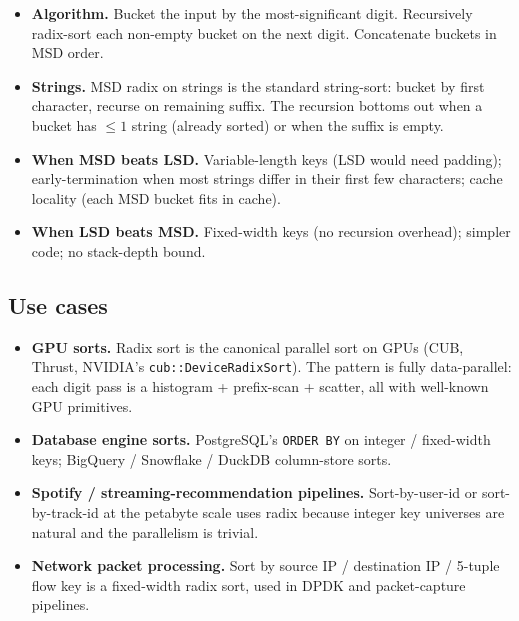 \documentclass[11pt]{article}
\begin{document}
\begin{itemize}[leftmargin=*]
    \item \textbf{Algorithm.} Bucket the input by the
          most-significant digit. Recursively radix-sort each
          non-empty bucket on the next digit. Concatenate buckets
          in MSD order.
    \item \textbf{Strings.} MSD radix on strings is the standard
          string-sort: bucket by first character, recurse on
          remaining suffix. The recursion bottoms out when a
          bucket has $\le 1$ string (already sorted) or when the
          suffix is empty.
    \item \textbf{When MSD beats LSD.} Variable-length keys (LSD
          would need padding); early-termination when most strings
          differ in their first few characters; cache locality
          (each MSD bucket fits in cache).
    \item \textbf{When LSD beats MSD.} Fixed-width keys
          (no recursion overhead); simpler code; no
          stack-depth bound.
\end{itemize}

\subsection*{Use cases}

\begin{itemize}[leftmargin=*]
    \item \textbf{GPU sorts.} Radix sort is the canonical parallel
          sort on GPUs (CUB, Thrust, NVIDIA's \texttt{cub::DeviceRadixSort}).
          The pattern is fully data-parallel: each digit pass is
          a histogram + prefix-scan + scatter, all with
          well-known GPU primitives.
    \item \textbf{Database engine sorts.} PostgreSQL's
          \texttt{ORDER BY} on integer / fixed-width keys; BigQuery
          / Snowflake / DuckDB column-store sorts.
    \item \textbf{Spotify / streaming-recommendation pipelines.}
          Sort-by-user-id or sort-by-track-id at the petabyte
          scale uses radix because integer key universes are
          natural and the parallelism is trivial.
    \item \textbf{Network packet processing.} Sort by source IP
          / destination IP / 5-tuple flow key is a fixed-width
          radix sort, used in DPDK and packet-capture pipelines.
\end{itemize}
\end{document}
